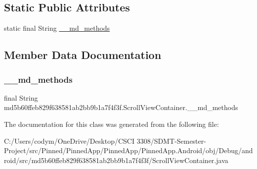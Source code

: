 \subsection*{Static Public Attributes}
\begin{DoxyCompactItemize}
\item 
static final String \hyperlink{classmd5b60ffeb829f638581ab2bb9b1a7f4f3f_1_1_scroll_view_container_adc93a3ae5f695e40173e7b339124ed69}{\+\_\+\+\_\+md\+\_\+methods}
\end{DoxyCompactItemize}


\subsection{Member Data Documentation}
\mbox{\label{classmd5b60ffeb829f638581ab2bb9b1a7f4f3f_1_1_scroll_view_container_adc93a3ae5f695e40173e7b339124ed69}} 
\subsubsection{\texorpdfstring{\+\_\+\+\_\+md\+\_\+methods}{\_\_md\_methods}}
{\footnotesize\ttfamily final String md5b60ffeb829f638581ab2bb9b1a7f4f3f.\+Scroll\+View\+Container.\+\_\+\+\_\+md\+\_\+methods\hspace{0.3cm}{\ttfamily [static]}}



The documentation for this class was generated from the following file\+:\begin{DoxyCompactItemize}
\item 
C\+:/\+Users/codym/\+One\+Drive/\+Desktop/\+C\+S\+C\+I 3308/\+S\+D\+M\+T-\/\+Semester-\/\+Project/src/\+Pinned/\+Pinned\+App/\+Pinned\+App/\+Pinned\+App.\+Android/obj/\+Debug/android/src/md5b60ffeb829f638581ab2bb9b1a7f4f3f/Scroll\+View\+Container.\+java\end{DoxyCompactItemize}
